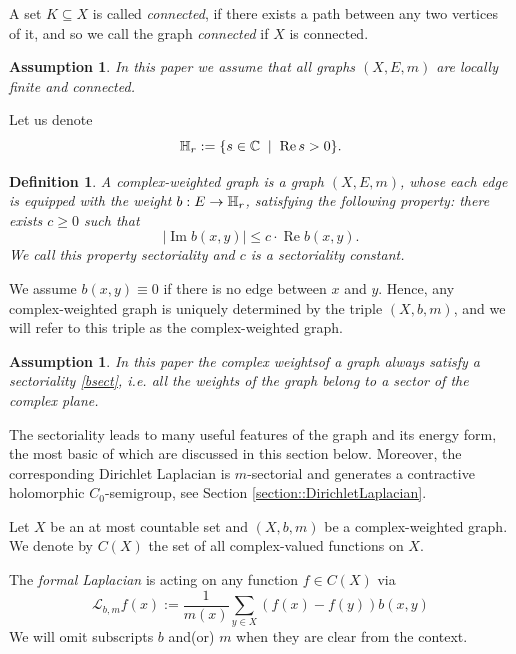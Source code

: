 \documentclass[10pt,a4paper]{amsart}
\newtheorem{definition}[theorem]{Definition}
\newtheorem{assumption}[theorem]{Assumption}
\renewcommand{\Re}{\operatorname{Re}}%
\renewcommand{\Im}{\operatorname{Im}}%
\renewcommand{\L}{\mathcal{L}}
\newcommand{\cfreq}{s}
\begin{document}
A set $ K\subseteq X $ is called {\em connected}, if there exists a path between any two vertices of it, and so we call  the graph \emph{connected} if $ X $ is connected.


\begin{assumption}\label{a:graph}  In this paper we assume that all graphs $ (X,E,m) $ are locally finite and connected.
\end{assumption}


Let us denote
$$
\Bbb H_r:=\{\cfreq \in \Bbb C\;\mid\;\Re \cfreq>0\}.
$$

\begin{definition}\label{def::complexweightedgraph}
A {\em complex-weighted graph} is a graph $(X,E,m)$, whose each edge is equipped with the weight $b:E\to \Bbb H_r$, satisfying the following property: there exists $c\ge 0$ such that
\begin{equation}\label{bsect}
\left|\Im b(x,y)\right|\le c \cdot \Re b(x,y).
\end{equation}
We call this property {\em sectoriality} and $c$ is a {\em sectoriality constant}.
\end{definition}
We assume $b(x,y)\equiv 0$ if there is no edge between $x$ and $y$. Hence, any complex-weighted graph is uniquely determined by the triple $(X,b,m)$, and we will refer to this triple as the complex-weighted graph.

\begin{assumption}
In this paper the complex weightsof a graph always satisfy a sectoriality \eqref{bsect}, i.e. all the weights of the graph belong to a sector of the complex plane.
\end{assumption}

The sectoriality  leads to many useful features of the graph and its energy form, the most basic of which are discussed in this section below. Moreover, the corresponding Dirichlet Laplacian is $m$-sectorial and generates a contractive holomorphic $C_0$-semigroup, see Section \ref{section::DirichletLaplacian}.



Let $X$ be an at most countable set and $(X,b,m)$ be a complex-weighted graph. We denote by $C(X)$ the set of all complex-valued functions on $X$.


The {\em formal Laplacian} is acting on  any function $f\in C(X)$ via
$$
\L_{b,m} f(x):=\dfrac{1}{m(x)}\sum_{y\in X} (f(x)-f(y)) b(x,y)
$$
We will omit subscripts $b$ and(or) $m$ when they are  clear from the context.
\end{document}
